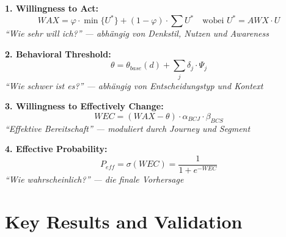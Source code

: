 \begin{tcolorbox}[
  title={\textbf{EBF: Die 4 Kernformeln}},
  colback=blue!3,
  colframe=blue!50!black,
  fonttitle=\bfseries\sffamily
]

\textbf{1. Willingness to Act:}
\begin{equation*}
WAX = \varphi \cdot \min\{U^*\} + (1-\varphi) \cdot \sum U^* \quad \text{wobei } U^* = AWX \cdot U
\end{equation*}
\textit{``Wie sehr will ich?'' --- abhängig von Denkstil, Nutzen und Awareness}

\vspace{6pt}
\textbf{2. Behavioral Threshold:}
\begin{equation*}
\theta = \theta_{base}(d) + \sum_j \delta_j \cdot \Psi_j
\end{equation*}
\textit{``Wie schwer ist es?'' --- abhängig von Entscheidungstyp und Kontext}

\vspace{6pt}
\textbf{3. Willingness to Effectively Change:}
\begin{equation*}
WEC = (WAX - \theta) \cdot \alpha_{BCJ} \cdot \beta_{BCS}
\end{equation*}
\textit{``Effektive Bereitschaft'' --- moduliert durch Journey und Segment}

\vspace{6pt}
\textbf{4. Effective Probability:}
\begin{equation*}
P_{eff} = \sigma(WEC) = \frac{1}{1 + e^{-WEC}}
\end{equation*}
\textit{``Wie wahrscheinlich?'' --- die finale Vorhersage}

\end{tcolorbox}




\section{Key Results and Validation}
\label{sec:av-results}

